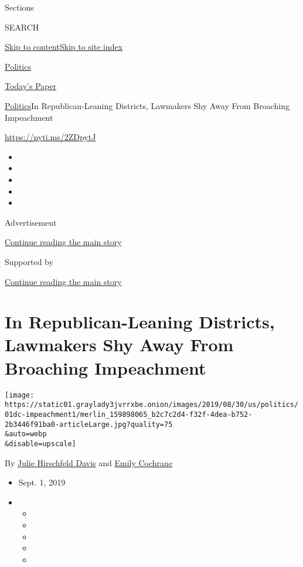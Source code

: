 Sections

SEARCH

\protect\hyperlink{site-content}{Skip to
content}\protect\hyperlink{site-index}{Skip to site index}

\href{https://www.nytimes3xbfgragh.onion/section/politics}{Politics}

\href{https://myaccount.nytimes3xbfgragh.onion/auth/login?response_type=cookie\&client_id=vi}{}

\href{https://www.nytimes3xbfgragh.onion/section/todayspaper}{Today's
Paper}

\href{/section/politics}{Politics}\textbar{}In Republican-Leaning
Districts, Lawmakers Shy Away From Broaching Impeachment

\url{https://nyti.ms/2ZDpytJ}

\begin{itemize}
\item
\item
\item
\item
\item
\end{itemize}

Advertisement

\protect\hyperlink{after-top}{Continue reading the main story}

Supported by

\protect\hyperlink{after-sponsor}{Continue reading the main story}

\hypertarget{in-republican-leaning-districts-lawmakers-shy-away-from-broaching-impeachment}{%
\section{In Republican-Leaning Districts, Lawmakers Shy Away From
Broaching
Impeachment}\label{in-republican-leaning-districts-lawmakers-shy-away-from-broaching-impeachment}}

\texttt{[image: https://static01.graylady3jvrrxbe.onion/images/2019/08/30/us/politics/01dc-impeachment1/merlin\_159898065\_b2c7c2d4-f32f-4dea-b752-2b3446f91ba0-articleLarge.jpg?quality=75\\\&auto=webp\\\&disable=upscale]}

By
\href{https://www.nytimes3xbfgragh.onion/by/julie-hirschfeld-davis}{Julie
Hirschfeld Davis} and
\href{https://www.nytimes3xbfgragh.onion/by/emily-cochrane}{Emily
Cochrane}

\begin{itemize}
\item
  Sept. 1, 2019
\item
  \begin{itemize}
  \item
  \item
  \item
  \item
  \item
  \end{itemize}
\end{itemize}

